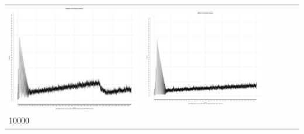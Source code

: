 \begin{table}[htbp]
{\begin{tabular}{l | ccccc}
\begin{minipage}{.15\textwidth}
     			 	\includegraphics[width=\linewidth]{images/mema-triple/N11}
    				 \end{minipage}
    			   &	 \begin{minipage}{.15\textwidth}
     			 	\includegraphics[width=\linewidth]{images/mema-triple/N13}
    				 \end{minipage}\\
		10000  &	 \begin{minipage}{.15\textwidth}

\end{minipage}
\end{tabular}}
\end{table}
